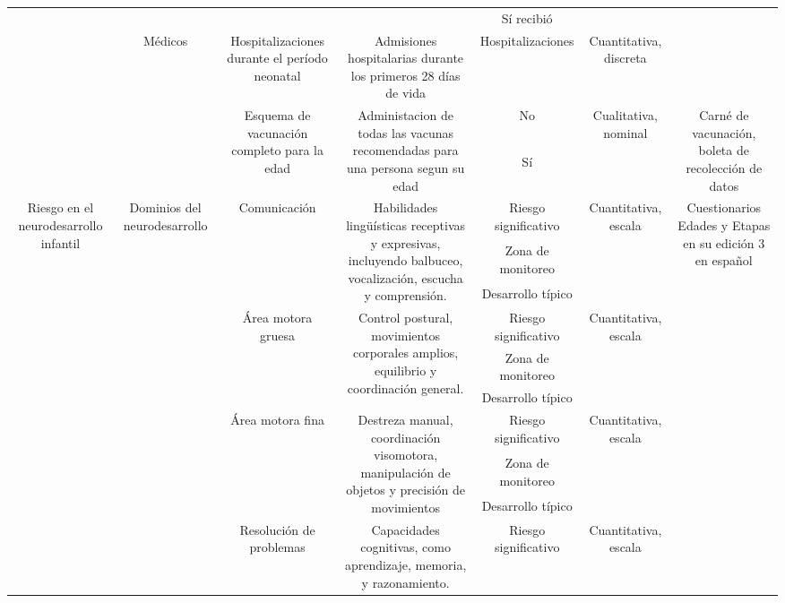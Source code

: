 \documentclass[11pt,letterpaper]{report}
\begin{document}
\begin{landscape}
\begin{longtable}{|c|c|c|c|c|c|c|}
 &  &  &  & Sí recibió &  &  \\ \cline{2-6}
 & \multirow{4}{*}{Médicos} & \multirow{2}{*}{Hospitalizaciones durante el período neonatal} & \multirow{2}{*}{Admisiones hospitalarias durante los primeros 28 días de vida} & \multirow{2}{*}{Hospitalizaciones} & \multirow{2}{*}{Cuantitativa, discreta} &  \\
 &  &  &  &  &  &  \\ \cline{3-7} 
 &  & \multirow{2}{*}{Esquema de vacunación completo para la edad} & \multirow{2}{*}{Administacion de todas las vacunas recomendadas para una persona segun su edad} & No & \multirow{2}{*}{Cualitativa, nominal} & \multirow{2}{*}{Carné de vacunación, boleta de recolección de datos} \\ \cline{5-5}
 &  &  &  & Sí &  &  \\ \hline
\multirow{15}{*}{Riesgo en el neurodesarrollo infantil} & \multirow{15}{*}{Dominios del neurodesarrollo} & \multirow{3}{*}{Comunicación} & \multirow{3}{*}{Habilidades lingüísticas receptivas y expresivas, incluyendo balbuceo, vocalización, escucha y comprensión.} & Riesgo significativo & \multirow{3}{*}{Cuantitativa, escala} & \multirow{15}{*}{Cuestionarios Edades y Etapas en su edición 3 en español} \\ \cline{5-5}
 &  &  &  & Zona de monitoreo &  &  \\ \cline{5-5}
 &  &  &  & Desarrollo típico &  &  \\ \cline{3-6}
 &  & \multirow{3}{*}{Área motora gruesa} & \multirow{3}{*}{Control postural, movimientos corporales amplios, equilibrio y coordinación general.} & Riesgo significativo & \multirow{3}{*}{Cuantitativa, escala} &  \\ \cline{5-5}
 &  &  &  & Zona de monitoreo &  &  \\ \cline{5-5}
 &  &  &  & Desarrollo típico &  &  \\ \cline{3-6}
 &  & \multirow{3}{*}{Área motora fina} & \multirow{3}{*}{Destreza manual, coordinación visomotora, manipulación de objetos y precisión de movimientos} & Riesgo significativo & \multirow{3}{*}{Cuantitativa, escala} &  \\ \cline{5-5}
 &  &  &  & Zona de monitoreo &  &  \\ \cline{5-5}
 &  &  &  & Desarrollo típico &  &  \\ \cline{3-6}
 &  & \multirow{3}{*}{Resolución de problemas} & \multirow{3}{*}{Capacidades cognitivas, como aprendizaje, memoria, y razonamiento.} & Riesgo significativo & \multirow{3}{*}{Cuantitativa, escala} &  \\ \cline{5-5}

\end{longtable}
\end{landscape}
\end{document}
